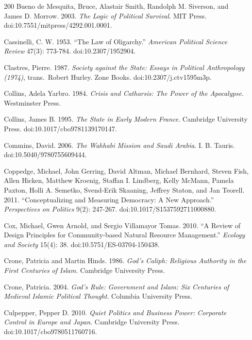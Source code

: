 \documentclass[11pt,letterpaper]{article}
\theoremstyle{definition}
\theoremstyle{remark}
\begin{document}
\begin{thebibliography}{200}
Bueno de Mesquita, Bruce, Alastair Smith, Randolph M. Siverson, and James D. Morrow. 2003. \emph{The Logic of Political Survival}. MIT Press. doi:10.7551/mitpress/4292.001.0001.

Cassinelli, C. W. 1953. ``The Law of Oligarchy.'' \emph{American Political Science Review} 47(3): 773-784. doi:10.2307/1952904.

Clastres, Pierre. 1987. \emph{Society against the State: Essays in Political Anthropology (1974)}, trans.~Robert Hurley. Zone Books. doi:10.2307/j.ctv1595m3p.

Collins, Adela Yarbro. 1984. \emph{Crisis and Catharsis: The Power of the Apocalypse}. Westminster Press.

Collins, James B. 1995. \emph{The State in Early Modern France}. Cambridge University Press. doi:10.1017/cbo9781139170147.

Commins, David. 2006. \emph{The Wahhabi Mission and Saudi Arabia}. I. B. Tauris. doi:10.5040/9780755609444.

Coppedge, Michael, John Gerring, David Altman, Michael Bernhard, Steven Fish, Allen Hicken, Matthew Kroenig, Staffan I. Lindberg, Kelly McMann, Pamela Paxton, Holli A. Semetko, Svend-Erik Skaaning, Jeffrey Staton, and Jan Teorell. 2011. ``Conceptualizing and Measuring Democracy: A New Approach.'' \emph{Perspectives on Politics} 9(2): 247-267. doi:10.1017/S1537592711000880.

Cox, Michael, Gwen Arnold, and Sergio Villamayor Tomas. 2010. ``A Review of Design Principles for Community-based Natural Resource Management.'' \emph{Ecology and Society} 15(4): 38. doi:10.5751/ES-03704-150438.

Crone, Patricia and Martin Hinds. 1986. \emph{God's Caliph: Religious Authority in the First Centuries of Islam}. Cambridge University Press.

Crone, Patricia. 2004. \emph{God's Rule: Government and Islam: Six Centuries of Medieval Islamic Political Thought}. Columbia University Press.

Culpepper, Pepper D. 2010. \emph{Quiet Politics and Business Power: Corporate Control in Europe and Japan}. Cambridge University Press. doi:10.1017/cbo9780511760716.


\end{thebibliography}
\end{document}
